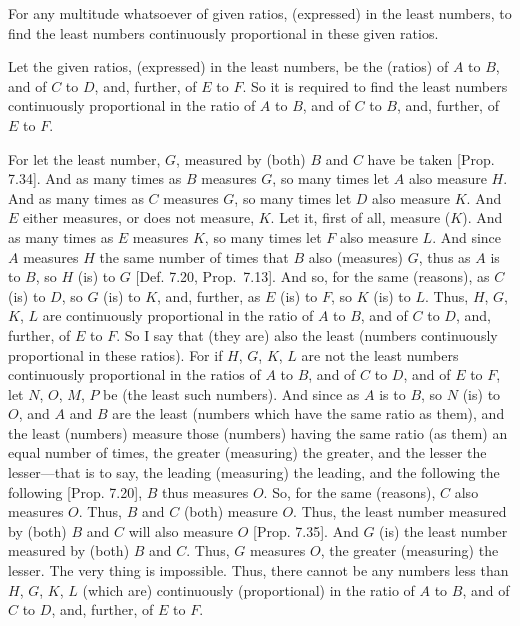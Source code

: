\begin{Parallel}{}{}
{For any multitude whatsoever of given ratios, (expressed) in the least numbers, to find the least numbers continuously proportional 
in these given ratios.

\epsfysize=1.7in
\centerline{}

Let the given ratios, (expressed) in the least numbers, be the (ratios) of
$A$ to $B$, and of $C$ to $D$, and, further,  of $E$ to $F$. So it is
required to find the least numbers continuously proportional  in the
ratio of $A$ to $B$, and  of $C$ to $B$, and, further,
 of $E$ to $F$.
 
For let the least number, $G$,  measured by (both) $B$ and $C$ have
be taken [Prop. 7.34]. And as many times
as $B$ measures $G$, so many times let $A$ also measure $H$.
And as many times as $C$ measures $G$, so many times let
$D$ also measure $K$. And $E$ either measures, or does not measure, $K$.
Let it, first of all, measure ($K$). And as many times as $E$ measures
$K$, so many times let $F$ also measure $L$. And since $A$
measures $H$ the same number of times that $B$ also (measures) $G$, thus as $A$ is to $B$, so $H$ (is) to $G$ [Def. 7.20, Prop.~7.13].
And so, for the same (reasons), as $C$ (is) to $D$, so
$G$ (is) to $K$, and, further, as $E$ (is) to $F$, so $K$ (is) to $L$.
Thus, $H$, $G$, $K$, $L$ are continuously proportional in the ratio
of $A$ to $B$, and of $C$ to $D$, and, further,  of $E$ to $F$. So I say that (they are) also the least
(numbers continuously proportional in these ratios). For if
$H$, $G$, $K$, $L$ are not the least numbers continuously proportional
 in the ratios of $A$ to $B$, and of $C$ to $D$, and of
$E$ to $F$, let $N$, $O$, $M$, $P$ be (the least such numbers). 
And since as $A$ is to $B$, so $N$ (is) to $O$, and $A$ and $B$ are the
least (numbers which have the same ratio as them), and the least (numbers) measure those (numbers)
having the same ratio (as them) an equal number of times, the greater (measuring) the greater, and the lesser the lesser---that is to say, the leading (measuring) the leading, and the
following the following [Prop. 7.20], $B$ thus
measures $O$. So, for the same (reasons), $C$ also measures $O$. Thus,
$B$ and $C$ (both) measure $O$. Thus, the least number measured by
(both) $B$ and $C$ will also measure $O$ [Prop. 7.35]. And $G$ (is) the least number measured by (both) $B$ and $C$. Thus, $G$ measures $O$, the greater
(measuring) the lesser. The very thing is impossible. Thus, there
cannot be any numbers less than $H$, $G$, $K$, $L$ 
(which are) continuously (proportional) in the ratio of $A$ to $B$, and of $C$ to $D$, and, further, of $E$ to $F$.

}
\end{Parallel}
